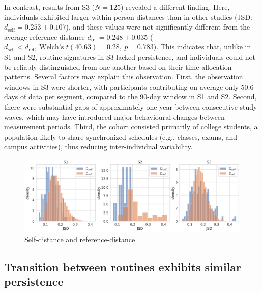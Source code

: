 \documentclass[pdflatex,sn-vancouver,Numbered]{bst/sn-jnl}%
\theoremstyle{thmstyleone}%
\theoremstyle{thmstyletwo}%
\theoremstyle{thmstylethree}%
\newcommand{\dself}[2]{$d_{\text{self}} = #1 \pm #2$}
\newcommand{\dref}[2]{$d_{\text{ref}} = #1 \pm #2$}
\newcommand{\dselfdrefp}[3]{$d_{\text{self}} < d_{\text{ref}},\ \text{Welch's } t(#1) = #2,\ p = #3$}
\newcommand{\dselfdrefpl}[3]{$d_{\text{self}} < d_{\text{ref}},\ \text{Welch's } t(#1) = #2,\ p < #3$}
\begin{document}
In contrast, results from S3 (\(N=125\)) revealed a different finding. Here, individuals exhibited larger within-person distances than in other studies (JSD: \dself{0.253}{0.107}), and these values were not significantly different from the average reference distance \dref{0.248}{0.035} (\dselfdrefp{40.63}{0.28}{0.783}). This indicates that, unlike in S1 and S2, routine signatures in S3 lacked persistence, and individuals could not be reliably distinguished from one another based on their time allocation patterns. Several factors may explain this observation. First, the observation windows in S3 were shorter, with participants contributing on average only 50.6 days of data per segment, compared to the 90-day window in S1 and S2. Second, there were substantial gaps of approximately one year between consecutive 
study waves, which may have introduced major behavioural changes between measurement 
periods. Third, the cohort consisted primarily of college students, a population likely to 
share synchronized schedules (e.g., classes, exams, and campus activities), 
thus reducing inter-individual variability.

\begin{figure}
    \centering
    \includegraphics[width=1\linewidth]{figures/combined_dself_dref_ranked_jsd.png}
    \caption{Self-distance and reference-distance}
    \label{fig:dself_dref}
\end{figure}

\subsection*{Transition between routines exhibits similar persistence}
\end{document}
